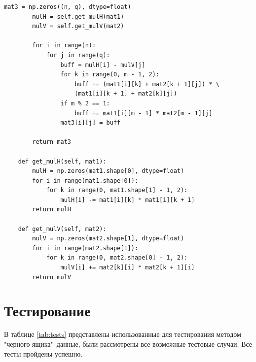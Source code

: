 \documentclass[a4paper,oneside,14pt]{extreport}
\begin{document}
\begin{lstlisting}[caption=Оптимизированный алгоритм Копперсмита-Винограда (часть 2), label={lst:optVinograd}]
		mat3 = np.zeros((n, q), dtype=float)
		mulH = self.get_mulH(mat1)
		mulV = self.get_mulV(mat2)
		
		for i in range(n):
			for j in range(q):
				buff = mulH[i] - mulV[j]
				for k in range(0, m - 1, 2):
					buff += (mat1[i][k] + mat2[k + 1][j]) * \
					(mat1[i][k + 1] + mat2[k][j])
				if m % 2 == 1:
					buff += mat1[i][m - 1] * mat2[m - 1][j]
				mat3[i][j] = buff
		
		return mat3
	
	def get_mulH(self, mat1):
		mulH = np.zeros(mat1.shape[0], dtype=float)
		for i in range(mat1.shape[0]):
			for k in range(0, mat1.shape[1] - 1, 2):
				mulH[i] -= mat1[i][k] * mat1[i][k + 1]
		return mulH
	
	def get_mulV(self, mat2):
		mulV = np.zeros(mat2.shape[1], dtype=float)
		for i in range(mat2.shape[1]):
			for k in range(0, mat2.shape[0] - 1, 2):
				mulV[i] += mat2[k][i] * mat2[k + 1][i]
		return mulV
\end{lstlisting}

\section{Тестирование}
В таблице \ref{tab:tests} представлены использованные для тестирования методом "черного ящика"\ данные, были рассмотрены все возможные тестовые случаи. Все тесты пройдены успешно.
\end{document}
